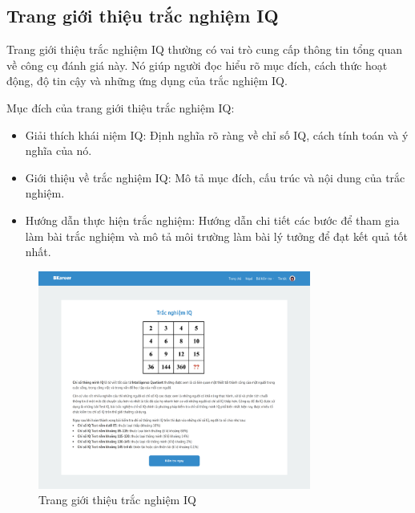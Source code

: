 


\subsection{Trang giới thiệu trắc nghiệm IQ}
Trang giới thiệu trắc nghiệm IQ thường có vai trò cung cấp thông tin tổng quan về công cụ đánh giá này. Nó giúp người đọc hiểu rõ mục đích, cách thức hoạt động, độ tin cậy và những ứng dụng của trắc nghiệm IQ.

Mục đích của trang giới thiệu trắc nghiệm IQ:
\begin{itemize}
    \item Giải thích khái niệm IQ: Định nghĩa rõ ràng về chỉ số IQ, cách tính toán và ý nghĩa của nó.
    \item Giới thiệu về trắc nghiệm IQ: Mô tả mục đích, cấu trúc và nội dung của trắc nghiệm.
    \item Hướng dẫn thực hiện trắc nghiệm: Hướng dẫn chi tiết các bước để tham gia làm bài trắc nghiệm và mô tả môi trường làm bài lý tưởng để đạt kết quả tốt nhất.
\end{itemize}

\begin{figure}[H]
    \centering
    \includegraphics[width=0.8\textwidth]
    {images/chap5/iqDetail.png}
    \vspace{0.5cm}
    \caption{Trang giới thiệu trắc nghiệm IQ}
\end{figure}

